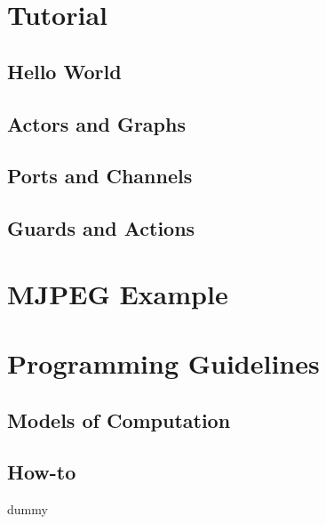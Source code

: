 \section{Tutorial}
\subsection{Hello World}

\subsection{Actors and Graphs}

\subsection{Ports and Channels}

\subsection{Guards and Actions}



\section{MJPEG Example}
\section{Programming Guidelines}
\subsection{Models of Computation}
\subsection{How-to}

\begin{frame}
  dummy
\end{frame}



